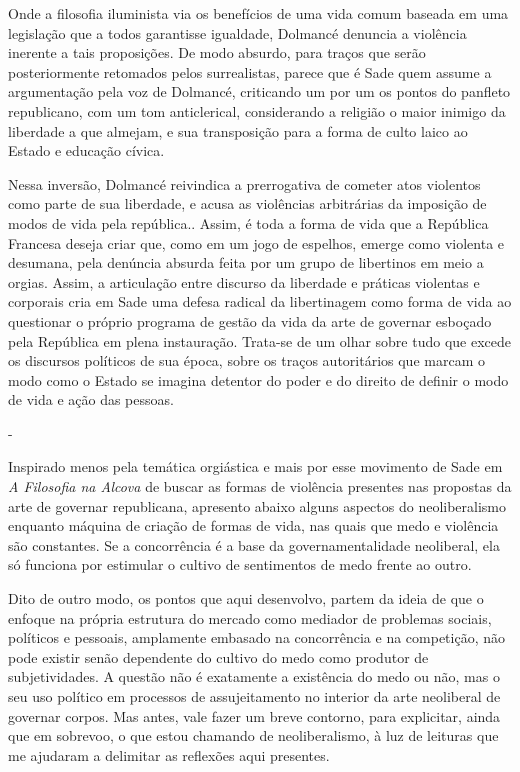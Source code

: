 Onde a filosofia iluminista via os benefícios de uma vida comum baseada
em uma legislação que a todos garantisse igualdade, Dolmancé denuncia a
violência inerente a tais proposições. De modo absurdo, para traços que
serão posteriormente retomados pelos surrealistas, parece que é Sade
quem assume a argumentação pela voz de Dolmancé, criticando um por um os
pontos do panfleto republicano, com um tom anticlerical, considerando a
religião o maior inimigo da liberdade a que almejam, e sua transposição
para a forma de culto laico ao Estado e educação cívica.

Nessa inversão, Dolmancé reivindica a prerrogativa de cometer atos
violentos como parte de sua liberdade, e acusa as violências arbitrárias
da imposição de modos de vida pela república.. Assim, é toda a forma de
vida que a República Francesa deseja criar que, como em um jogo de
espelhos, emerge como violenta e desumana, pela denúncia absurda feita
por um grupo de libertinos em meio a orgias. Assim, a articulação entre
discurso da liberdade e práticas violentas e corporais cria em Sade uma
defesa radical da libertinagem como forma de vida ao questionar o
próprio programa de gestão da vida da arte de governar esboçado pela
República em plena instauração. Trata-se de um olhar sobre tudo que
excede os discursos políticos de sua época, sobre os traços autoritários
que marcam o modo como o Estado se imagina detentor do poder e do
direito de definir o modo de vida e ação das pessoas.

-

Inspirado menos pela temática orgiástica e mais por esse movimento de
Sade em \emph{A Filosofia na Alcova} de buscar as formas de violência
presentes nas propostas da arte de governar republicana, apresento
abaixo alguns aspectos do neoliberalismo enquanto máquina de criação de
formas de vida, nas quais que medo e violência são constantes. Se a
concorrência é a base da governamentalidade neoliberal, ela só funciona
por estimular o cultivo de sentimentos de medo frente ao outro.

Dito de outro modo, os pontos que aqui desenvolvo, partem da ideia de
que o enfoque na própria estrutura do mercado como mediador de problemas
sociais, políticos e pessoais, amplamente embasado na concorrência e na
competição, não pode existir senão dependente do cultivo do medo como
produtor de subjetividades. A questão não é exatamente a existência do
medo ou não, mas o seu uso político em processos de assujeitamento no
interior da arte neoliberal de governar corpos. Mas antes, vale fazer um
breve contorno, para explicitar, ainda que em sobrevoo, o que estou
chamando de neoliberalismo, à luz de leituras que me ajudaram a
delimitar as reflexões aqui presentes.

